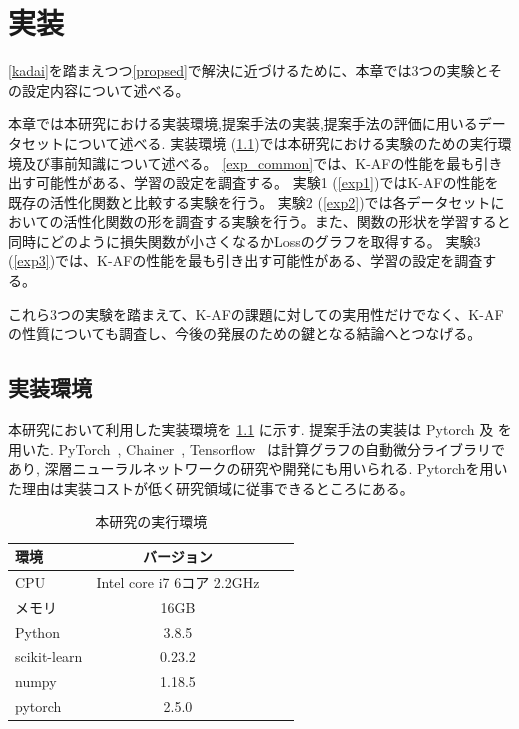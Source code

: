 \chapter{実装}
\label{implementation}

\ref{kadai}を踏まえつつ\ref{propsed}で解決に近づけるために、本章では3つの実験とその設定内容について述べる。

本章では本研究における実装環境,提案手法の実装,提案手法の評価に用いるデータセットについて述べる.
実装環境 (\ref{impl_env})では本研究における実験のための実行環境及び事前知識について述べる。
\ref{exp_common}では、K-AFの性能を最も引き出す可能性がある、学習の設定を調査する。
実験1 (\ref{exp1})ではK-AFの性能を既存の活性化関数と比較する実験を行う。
実験2 (\ref{exp2})では各データセットにおいての活性化関数の形を調査する実験を行う。また、関数の形状を学習すると同時にどのように損失関数が小さくなるかLossのグラフを取得する。
実験3 (\ref{exp3})では、K-AFの性能を最も引き出す可能性がある、学習の設定を調査する。

これら3つの実験を踏まえて、K-AFの課題に対しての実用性だけでなく、K-AFの性質についても調査し、今後の発展のための鍵となる結論へとつなげる。



\section{実装環境}
\label{impl_env}



本研究において利用した実装環境を \ref{impl_table} に示す. 提案手法の実装は Pytorch 及
を用いた.  PyTorch~\cite{pytorch}, Chainer~\cite{chainer},  Tensorflow~\cite{tensorflow} は計算グラフの自動微分ライブラリであり, 深層ニューラルネットワークの研究や開発にも用いられる.
Pytorchを用いた理由は実装コストが低く研究領域に従事できるところにある。


\begin{table}[htbp]
\label{impl_table}
    \begin{center}
        \caption{本研究の実行環境}
        \vspace{2mm} 
        \begin{tabular}{l*{2}{c}r}
        環境              & バージョン \\
        \hline
        CPU               & Intel core i7 6コア 2.2GHz \\
        メモリ             & 16GB \\
        Python            & 3.8.5  \\
        scikit-learn      & 0.23.2\\
        numpy             & 1.18.5 \\
        pytorch           & 2.5.0 \\
        \end{tabular}
    \end{center}
\end{table}



